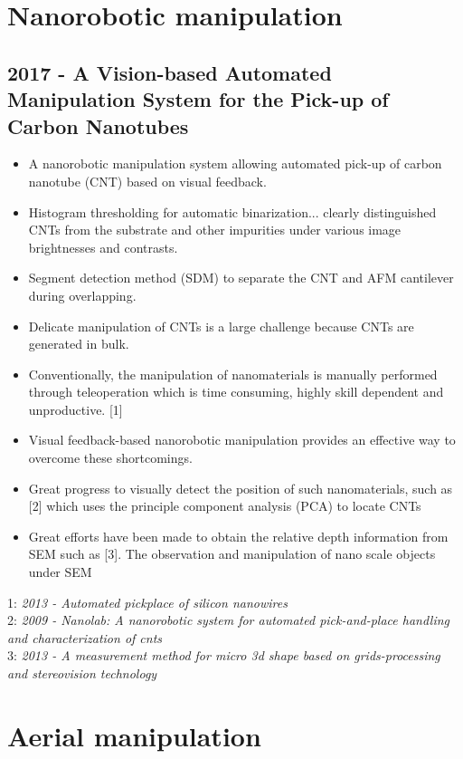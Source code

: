 \section{Nanorobotic manipulation}
\subsection{2017 - A Vision-based Automated Manipulation System for the Pick-up of Carbon Nanotubes}
\begin{itemize}
\item A nanorobotic manipulation system allowing automated pick-up of carbon nanotube (CNT) based on visual feedback.
\item Histogram thresholding for automatic binarization... clearly distinguished CNTs from the substrate and other impurities under various image brightnesses and contrasts.
\item Segment detection method (SDM) to separate the CNT
and AFM cantilever during overlapping.
\item Delicate manipulation of CNTs is a large challenge because CNTs are generated in bulk.
\item Conventionally, the manipulation of nanomaterials is manually performed through teleoperation which is time consuming, highly skill dependent and unproductive. [1]
\item Visual feedback-based nanorobotic manipulation
provides an effective way to overcome these shortcomings. 
\item Great progress to visually detect the position
of such nanomaterials, such as [2] which uses the principle component analysis (PCA) to locate CNTs
\item Great efforts have been made to obtain the relative depth information from SEM such as [3]. The observation and manipulation of nano scale objects under SEM
\end{itemize}
1: \textit{2013 - Automated pickplace of silicon nanowires} \\
2: \textit{2009 - Nanolab: A nanorobotic system for automated pick-and-place handling and characterization of cnts} \\
3: \textit{2013 - A measurement method for micro 3d shape
based on grids-processing and stereovision technology}


\section{Aerial manipulation}

